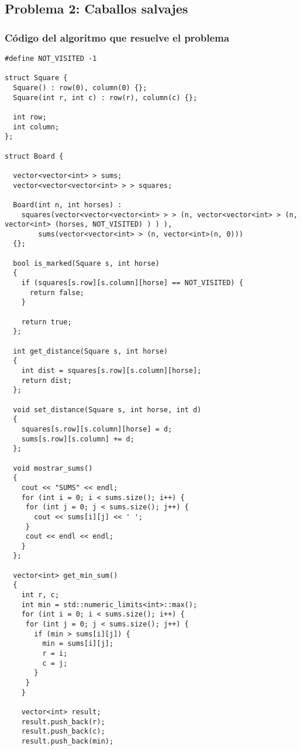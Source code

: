 \subsection{Problema 2: Caballos salvajes}

\subsubsection{Código del algoritmo que resuelve el problema}
\begin{lstlisting}[frame=single]
#define NOT_VISITED -1

struct Square {
  Square() : row(0), column(0) {};
  Square(int r, int c) : row(r), column(c) {};

  int row;
  int column;
};

struct Board {

  vector<vector<int> > sums;
  vector<vector<vector<int> > > squares;
  
  Board(int n, int horses) : 
    squares(vector<vector<vector<int> > > (n, vector<vector<int> > (n, vector<int> (horses, NOT_VISITED) ) ) ), 
        sums(vector<vector<int> > (n, vector<int>(n, 0)))
  {};

  bool is_marked(Square s, int horse)
  {
    if (squares[s.row][s.column][horse] == NOT_VISITED) {
      return false;
    }
    
    return true;
  };

  int get_distance(Square s, int horse) 
  {
    int dist = squares[s.row][s.column][horse];
    return dist;
  };

  void set_distance(Square s, int horse, int d)
  {
    squares[s.row][s.column][horse] = d;
    sums[s.row][s.column] += d;
  };

  void mostrar_sums()
  {
    cout << "SUMS" << endl;
    for (int i = 0; i < sums.size(); i++) {
     for (int j = 0; j < sums.size(); j++) {
       cout << sums[i][j] << ' ';
     }
     cout << endl << endl;
    }
  };

  vector<int> get_min_sum() 
  {
    int r, c;
    int min = std::numeric_limits<int>::max();
    for (int i = 0; i < sums.size(); i++) {
     for (int j = 0; j < sums.size(); j++) {
       if (min > sums[i][j]) {
         min = sums[i][j];
         r = i;
         c = j;
       }
     }
    }
    
    vector<int> result;
    result.push_back(r);
    result.push_back(c);
    result.push_back(min);


\end{lstlisting}

